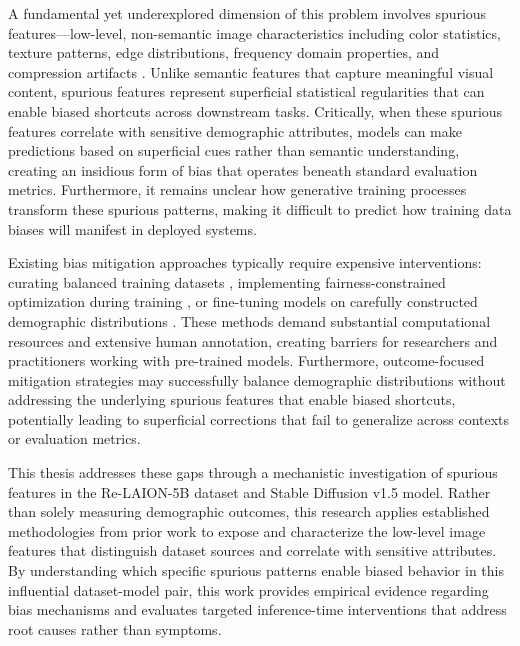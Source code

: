 A fundamental yet underexplored dimension of this problem involves spurious features—low-level, non-semantic image characteristics including color statistics, texture patterns, edge distributions, frequency domain properties, and compression artifacts \cite{Meister_2023_GenderArtifactsinVisualDatasets, Zeng_2024_UnderstandingBiasinLargeScaleVisualDatasets}. Unlike semantic features that capture meaningful visual content, spurious features represent superficial statistical regularities that can enable biased shortcuts across downstream tasks. Critically, when these spurious features correlate with sensitive demographic attributes, models can make predictions based on superficial cues rather than semantic understanding, creating an insidious form of bias that operates beneath standard evaluation metrics. Furthermore, it remains unclear how generative training processes transform these spurious patterns, making it difficult to predict how training data biases will manifest in deployed systems.

Existing bias mitigation approaches typically require expensive interventions: curating balanced training datasets \cite{Yang_2020_FairerDatasets}, implementing fairness-constrained optimization during training \cite{Zhang_2018_MitigatingUnwantedBiasesAdversarial}, or fine-tuning models on carefully constructed demographic distributions \cite{Friedrich_2023_FairDiffusionInstructingTextToImage}. These methods demand substantial computational resources and extensive human annotation, creating barriers for researchers and practitioners working with pre-trained models. Furthermore, outcome-focused mitigation strategies may successfully balance demographic distributions without addressing the underlying spurious features that enable biased shortcuts, potentially leading to superficial corrections that fail to generalize across contexts or evaluation metrics.

This thesis addresses these gaps through a mechanistic investigation of spurious features in the Re-LAION-5B dataset and Stable Diffusion v1.5 model. Rather than solely measuring demographic outcomes, this research applies established methodologies from prior work to expose and characterize the low-level image features that distinguish dataset sources and correlate with sensitive attributes. By understanding which specific spurious patterns enable biased behavior in this influential dataset-model pair, this work provides empirical evidence regarding bias mechanisms and evaluates targeted inference-time interventions that address root causes rather than symptoms.

